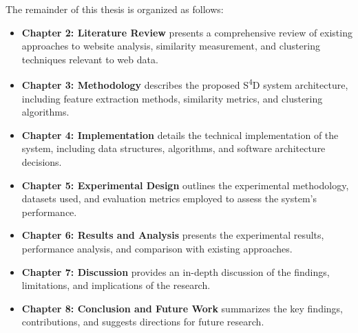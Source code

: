 The remainder of this thesis is organized as follows:

\begin{itemize}
    \item \textbf{Chapter 2: Literature Review} presents a comprehensive review of existing approaches to website analysis, similarity measurement, and clustering techniques relevant to web data.
    
    \item \textbf{Chapter 3: Methodology} describes the proposed S\textsuperscript{4}D system architecture, including feature extraction methods, similarity metrics, and clustering algorithms.
    
    \item \textbf{Chapter 4: Implementation} details the technical implementation of the system, including data structures, algorithms, and software architecture decisions.
    
    \item \textbf{Chapter 5: Experimental Design} outlines the experimental methodology, datasets used, and evaluation metrics employed to assess the system's performance.
    
    \item \textbf{Chapter 6: Results and Analysis} presents the experimental results, performance analysis, and comparison with existing approaches.
    
    \item \textbf{Chapter 7: Discussion} provides an in-depth discussion of the findings, limitations, and implications of the research.
    
    \item \textbf{Chapter 8: Conclusion and Future Work} summarizes the key findings, contributions, and suggests directions for future research.
\end{itemize} 